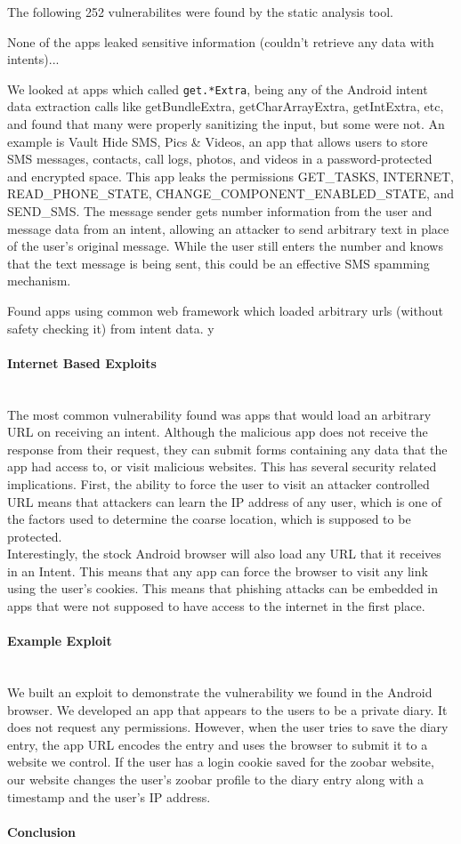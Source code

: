 \documentclass[12pt,a4paper]{article} \usepackage{verbatim}
\begin{document}
The following 252 vulnerabilites were found by the static analysis tool.



None of the apps leaked sensitive information (couldn't retrieve any data with
intents)...

We looked at apps which called \texttt{get.*Extra}, being any of the Android
intent data extraction calls like getBundleExtra, getCharArrayExtra,
getIntExtra, etc, and found that many were properly sanitizing the input, but
some were not. An example is Vault Hide SMS, Pics \& Videos, an app that allows
users to store SMS messages, contacts, call logs, photos, and videos in a
password-protected and encrypted space. This app leaks the permissions
GET\_TASKS, INTERNET, READ\_PHONE\_STATE, CHANGE\_COMPONENT\_ENABLED\_STATE, and
SEND\_SMS. The message sender gets number information from the user and message
data from an intent, allowing an attacker to send arbitrary text in place of the
user's original message. While the user still enters the number and knows that
the text message is being sent, this could be an effective SMS spamming
mechanism.

Found apps using common web framework which loaded arbitrary urls (without
safety checking it) from intent data.  y

\paragraph{Internet Based Exploits} ~\\ The most common vulnerability found was
apps that would load an arbitrary URL on receiving an intent. Although the
malicious app does not receive the response from their request, they can submit
forms containing any data that the app had access to, or visit malicious
websites. This has several security related implications. First, the ability to
force the user to visit an attacker controlled URL means that attackers can
learn the IP address of any user, which is one of the factors used to determine
the coarse location, which is supposed to be protected.  \\ Interestingly, the
stock Android browser will also load any URL that it receives in an Intent. This
means that any app can force the browser to visit any link using the user's
cookies. This means that phishing attacks can be embedded in apps that were not
supposed to have access to the internet in the first place. 

\paragraph{Example Exploit} ~\\
We built an exploit to demonstrate the vulnerability we found in the Android browser. We developed an app that appears to the users to be a private diary. It does not request any permissions. However, when the user tries to save the diary entry, the app URL encodes the entry and uses the browser to submit it to a website we control. If the user has a login cookie saved for the zoobar website, our website changes the user's zoobar profile to the diary entry along with a timestamp and the user's IP address. 

\paragraph{Conclusion} ~\\

 
\end{document}
